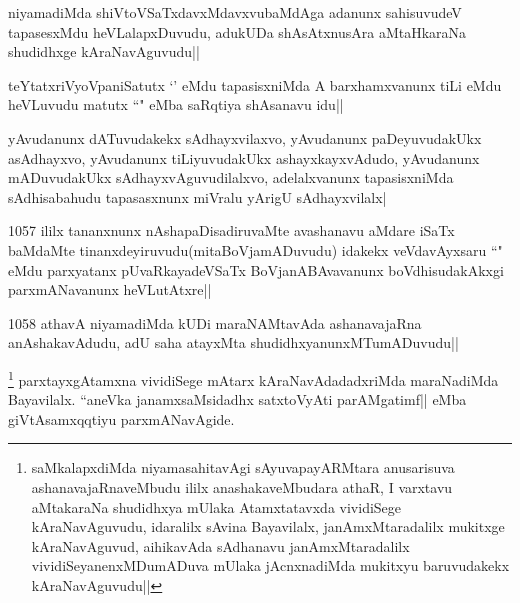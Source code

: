 
\begin{artha}
niyamadiMda shiVtoVSaTxdavxMdavxvubaMdAga adanunx sahisuvudeV tapasesxMdu heVLalapxDuvudu, adukUDa shAsAtxnusAra aMtaHkaraNa shudidhxge kAraNavAguvudu||
\end{artha}

\begin{artha}
teYtatxriVyoVpaniSatutx `\stext' eMdu tapasisxniMda A barxhamxvanunx tiLi eMdu heVLuvudu matutx ``\stext" eMba saRqtiya shAsanavu idu||
\end{artha}


\begin{artha}
yAvudanunx dATuvudakekx sAdhayxvilaxvo, yAvudanunx paDeyuvudakUkx asAdhayxvo, yAvudanunx tiLiyuvudakUkx ashayxkayxvAdudo, yAvudanunx mADuvudakUkx sAdhayxvAguvudilalxvo, adelalxvanunx tapasisxniMda sAdhisabahudu tapasasxnunx miVralu yArigU sAdhayxvilalx|
\end{artha}


\begin{artha}
1057 ililx tananxnunx nAshapaDisadiruvaMte avashanavu aMdare iSaTx baMdaMte tinanxdeyiruvudu(mitaBoVjamADuvudu) idakekx veVdavAyxsaru ``\stext" eMdu parxyatanx pUvaRkayadeVSaTx BoVjanABAvavanunx boVdhisudakAkxgi parxmANavanunx heVLutAtxre||
\end{artha}

\begin{artha}
1058 athavA niyamadiMda kUDi maraNAMtavAda ashanavajaRna anAshakavAdudu, adU saha atayxMta shudidhxyanunxMTumADuvudu||
\end{artha}

\begin{artha}
\footnote{saMkalapxdiMda niyamasahitavAgi sAyuvapayARMtara anusarisuva ashanavajaRnaveMbudu ililx anashakaveMbudara athaR, I varxtavu aMtakaraNa shudidhxya mUlaka Atamxtatavxda vividiSege kAraNavAguvudu, idaralilx sAvina Bayavilalx, janAmxMtaradalilx mukitxge kAraNavAguvud, aihikavAda sAdhanavu janAmxMtaradalilx vividiSeyanenxMDumADuva mUlaka jAcnxnadiMda mukitxyu baruvudakekx kAraNavAguvudu||} parxtayxgAtamxna vividiSege mAtarx kAraNavAdadadxriMda maraNadiMda Bayavilalx. ``aneVka janamxsaMsidadhx satxtoVyAti parAMgatimf|| eMba giVtAsamxqqtiyu parxmANavAgide.
\end{artha}



